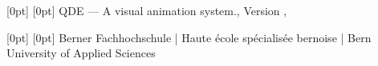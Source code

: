 \documentclass[
    a4paper,      %
    10pt,         %
    openright,    %
    notitlepage,  %
    parskip=half, %
]{scrreprt}       %
\theoremstyle{definition}                    %
\begin{document}

\providecommand{\titletext}{QDE --- A visual animation system.}
\providecommand{\subtitletext}{MTE7103}
\providecommand{\subsubtitletext}{Master-Thesis}

  [0pt] %
  [0pt] %
  {} %
  {} %
  {} %
  {\color{bfhgrey} \footnotesize \titletext, Version \vhCurrentVersion,
      \vhCurrentDate} %
  {} %
  {\color{bfhgrey} \thepage} %

  [0pt] %
  [0pt] %
  {} %
  {} %
  {} %
  {\color{bfhgrey}\fontsize{9pt}{10pt}\selectfont
    Berner Fachhochschule | Haute école spécialisée bernoise | Bern
    University of Applied Sciences} %
  {} %
  {} %


\pagestyle{newlayout}
\renewcommand{\chapterpagestyle}{newlayout}
\renewcommand{\chaptermark}[1]{\markboth{\thechapter.  #1}{}}
\renewcommand*{\headfont}{\normalfont}
\renewcommand*{\footfont}{\normalfont}

\setcounter{page}{1}
\end{document}
